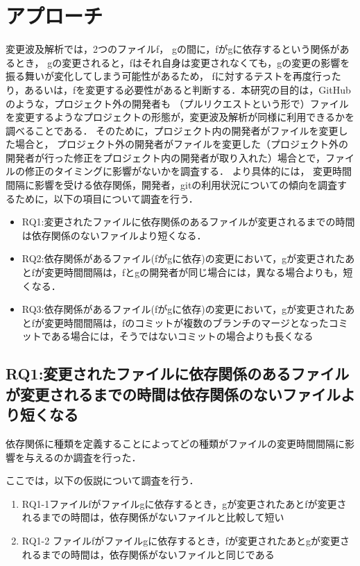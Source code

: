 \documentclass{fose2016}           %
\begin{document}
\section{アプローチ}\label{アプローチ}
変更波及解析では，2つのファイルf， gの間に，fがgに依存するという関係があるとき， gの変更されると，fはそれ自身は変更されなくても，gの変更の影響を振る舞いが変化してしまう可能性があるため， fに対するテストを再度行ったり，あるいは，fを変更する必要性があると判断する．本研究の目的は，GitHubのような，プロジェクト外の開発者も （プルリクエストという形で）ファイルを変更するようなプロジェクトの形態が，変更波及解析が同様に利用できるかを調べることである． そのために，プロジェクト内の開発者がファイルを変更した場合と， プロジェクト外の開発者がファイルを変更した（プロジェクト外の開発者が行った修正をプロジェクト内の開発者が取り入れた）場合とで，ファイルの修正のタイミングに影響がないかを調査する． より具体的には，
変更時間間隔に影響を受ける依存関係，開発者，gitの利用状況についての傾向を調査するために，以下の項目について調査を行う．
\begin{itemize}
\item RQ1:変更されたファイルに依存関係のあるファイルが変更されるまでの時間は依存関係のないファイルより短くなる．
\item RQ2:依存関係があるファイル(fがgに依存)の変更において，gが変更されたあとfが変更時間間隔は，fとgの開発者が同じ場合には，異なる場合よりも，短くなる．
\item RQ3:依存関係があるファイル(fがgに依存)の変更において，gが変更されたあとfが変更時間間隔は，fのコミットが複数のブランチのマージとなったコミットである場合には，そうではないコミットの場合よりも長くなる
\end{itemize}
\subsection{RQ1:変更されたファイルに依存関係のあるファイルが変更されるまでの時間は依存関係のないファイルより短くなる}
依存関係に種類を定義することによってどの種類がファイルの変更時間間隔に影響を与えるのか調査を行った．

ここでは，以下の仮説について調査を行う．
\begin{enumerate}
\item RQ1-1ファイルfがファイルgに依存するとき，gが変更されたあとfが変更されるまでの時間は，依存関係がないファイルと比較して短い
\item RQ1-2 ファイルfがファイルgに依存するとき，fが変更されたあとgが変更されるまでの時間は，依存関係がないファイルと同じである
\end{enumerate}
\end{document}
